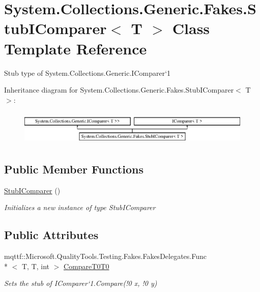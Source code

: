 \hypertarget{class_system_1_1_collections_1_1_generic_1_1_fakes_1_1_stub_i_comparer_3_01_t_01_4}{\section{System.\-Collections.\-Generic.\-Fakes.\-Stub\-I\-Comparer$<$ T $>$ Class Template Reference}
\label{class_system_1_1_collections_1_1_generic_1_1_fakes_1_1_stub_i_comparer_3_01_t_01_4}
}


Stub type of System.\-Collections.\-Generic.\-I\-Comparer`1 


Inheritance diagram for System.\-Collections.\-Generic.\-Fakes.\-Stub\-I\-Comparer$<$ T $>$\-:\begin{figure}[H]
\begin{center}
\leavevmode
\includegraphics[height=1.686747cm]{class_system_1_1_collections_1_1_generic_1_1_fakes_1_1_stub_i_comparer_3_01_t_01_4}
\end{center}
\end{figure}
\subsection*{Public Member Functions}
\begin{DoxyCompactItemize}
\item 
\hyperlink{class_system_1_1_collections_1_1_generic_1_1_fakes_1_1_stub_i_comparer_3_01_t_01_4_a1043f8c15b682603ece9bdf4f5b7d327}{Stub\-I\-Comparer} ()
\begin{DoxyCompactList}\small\item\em Initializes a new instance of type Stub\-I\-Comparer\end{DoxyCompactList}\end{DoxyCompactItemize}
\subsection*{Public Attributes}
\begin{DoxyCompactItemize}
\item 
mqttf\-::\-Microsoft.\-Quality\-Tools.\-Testing.\-Fakes.\-Fakes\-Delegates.\-Func\\*
$<$ T, T, int $>$ \hyperlink{class_system_1_1_collections_1_1_generic_1_1_fakes_1_1_stub_i_comparer_3_01_t_01_4_a6c32de1aeb93781308e06783cff9d466}{Compare\-T0\-T0}
\begin{DoxyCompactList}\small\item\em Sets the stub of I\-Comparer`1.Compare(!0 x, !0 y)\end{DoxyCompactList}\end{DoxyCompactItemize}


